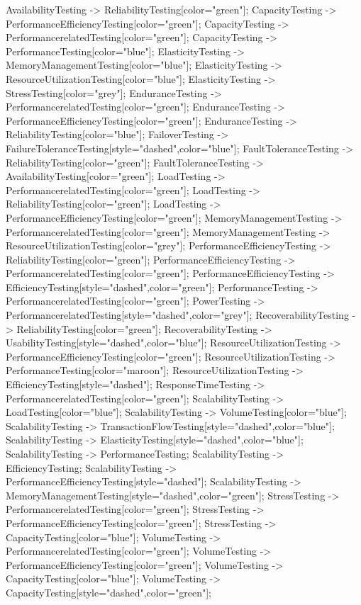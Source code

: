 \documentclass{article}
\begin{document}
{AvailabilityTesting -> ReliabilityTesting[color="green"];
CapacityTesting -> PerformanceEfficiencyTesting[color="green"];
CapacityTesting -> PerformancerelatedTesting[color="green"];
CapacityTesting -> PerformanceTesting[color="blue"];
ElasticityTesting -> MemoryManagementTesting[color="blue"];
ElasticityTesting -> ResourceUtilizationTesting[color="blue"];
ElasticityTesting -> StressTesting[color="grey"];
EnduranceTesting -> PerformancerelatedTesting[color="green"];
EnduranceTesting -> PerformanceEfficiencyTesting[color="green"];
EnduranceTesting -> ReliabilityTesting[color="blue"];
FailoverTesting -> FailureToleranceTesting[style="dashed",color="blue"];
FaultToleranceTesting -> ReliabilityTesting[color="green"];
FaultToleranceTesting -> AvailabilityTesting[color="green"];
LoadTesting -> PerformancerelatedTesting[color="green"];
LoadTesting -> ReliabilityTesting[color="green"];
LoadTesting -> PerformanceEfficiencyTesting[color="green"];
MemoryManagementTesting -> PerformancerelatedTesting[color="green"];
MemoryManagementTesting -> ResourceUtilizationTesting[color="grey"];
PerformanceEfficiencyTesting -> ReliabilityTesting[color="green"];
PerformanceEfficiencyTesting -> PerformancerelatedTesting[color="green"];
PerformanceEfficiencyTesting -> EfficiencyTesting[style="dashed",color="green"];
PerformanceTesting -> PerformancerelatedTesting[color="green"];
PowerTesting -> PerformancerelatedTesting[style="dashed",color="grey"];
RecoverabilityTesting -> ReliabilityTesting[color="green"];
RecoverabilityTesting -> UsabilityTesting[style="dashed",color="blue"];
ResourceUtilizationTesting -> PerformanceEfficiencyTesting[color="green"];
ResourceUtilizationTesting -> PerformanceTesting[color="maroon"];
ResourceUtilizationTesting -> EfficiencyTesting[style="dashed"];
ResponseTimeTesting -> PerformancerelatedTesting[color="green"];
ScalabilityTesting -> LoadTesting[color="blue"];
ScalabilityTesting -> VolumeTesting[color="blue"];
ScalabilityTesting -> TransactionFlowTesting[style="dashed",color="blue"];
ScalabilityTesting -> ElasticityTesting[style="dashed",color="blue"];
ScalabilityTesting -> PerformanceTesting;
ScalabilityTesting -> EfficiencyTesting;
ScalabilityTesting -> PerformanceEfficiencyTesting[style="dashed"];
ScalabilityTesting -> MemoryManagementTesting[style="dashed",color="green"];
StressTesting -> PerformancerelatedTesting[color="green"];
StressTesting -> PerformanceEfficiencyTesting[color="green"];
StressTesting -> CapacityTesting[color="blue"];
VolumeTesting -> PerformancerelatedTesting[color="green"];
VolumeTesting -> PerformanceEfficiencyTesting[color="green"];
VolumeTesting -> CapacityTesting[color="blue"];
VolumeTesting -> CapacityTesting[style="dashed",color="green"];

}
\end{document}
